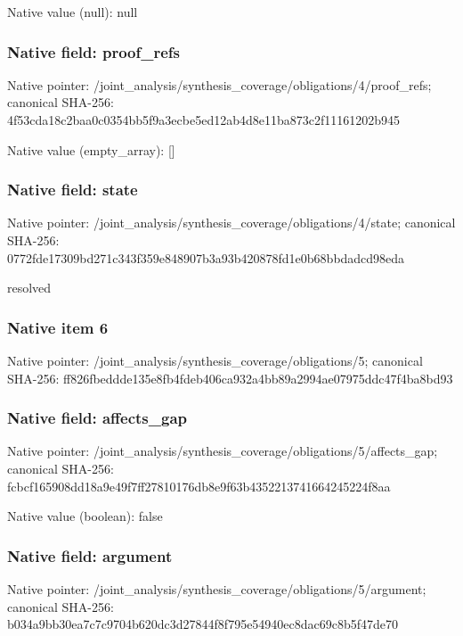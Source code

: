 \documentclass[10pt,a4paper]{article}
\begin{document}
Native value (null): null

\subsubsection{Native field: proof\_\allowbreak{}refs}
Native pointer: /joint\_\allowbreak{}analysis/synthesis\_\allowbreak{}coverage/obligations/4/proof\_\allowbreak{}refs; canonical SHA-256: 4f53cda18c2baa0c0354bb5f9a3ecbe5ed12ab4d8e11ba873c2f11161202b945

Native value (empty\_\allowbreak{}array): []

\subsubsection{Native field: state}
Native pointer: /joint\_\allowbreak{}analysis/synthesis\_\allowbreak{}coverage/obligations/4/state; canonical SHA-256: 0772fde17309bd271c343f359e848907b3a93b420878fd1e0b68bbdadcd98eda

\begingroup\raggedright\sloppy resolved\par\endgroup

\subsubsection{Native item 6}
Native pointer: /joint\_\allowbreak{}analysis/synthesis\_\allowbreak{}coverage/obligations/5; canonical SHA-256: ff826fbeddde135e8fb4fdeb406ca932a4bb89a2994ae07975ddc47f4ba8bd93

\subsubsection{Native field: affects\_\allowbreak{}gap}
Native pointer: /joint\_\allowbreak{}analysis/synthesis\_\allowbreak{}coverage/obligations/5/affects\_\allowbreak{}gap; canonical SHA-256: fcbcf165908dd18a9e49f7ff27810176db8e9f63b4352213741664245224f8aa

Native value (boolean): false

\subsubsection{Native field: argument}
Native pointer: /joint\_\allowbreak{}analysis/synthesis\_\allowbreak{}coverage/obligations/5/argument; canonical SHA-256: b034a9bb30ea7c7c9704b620dc3d27844f8f795e54940ec8dac69c8b5f47de70
\end{document}
